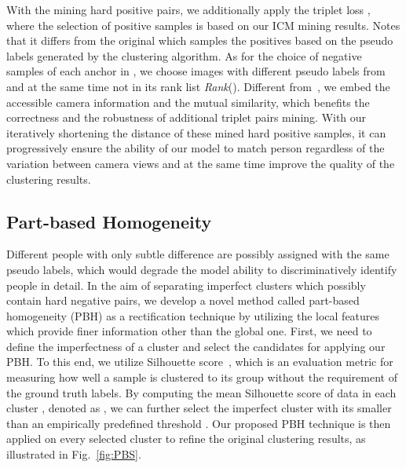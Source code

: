 With the mining hard positive pairs, we additionally apply the triplet loss , where the selection of positive samples is based on our ICM mining results. Notes that it differs from the original  which samples the positives based on the pseudo labels generated by the clustering algorithm.
As for the choice of negative samples of each anchor  in , we choose images with different pseudo labels from  and at the same time not in its rank list \textit{Rank}().
Different from~\cite{PAST}, we embed the accessible camera information and the mutual similarity, which benefits the correctness and the robustness of additional triplet pairs mining.
With our  iteratively shortening the distance of these mined hard positive samples, it can progressively ensure the ability of our model to match person regardless of the variation between camera views and at the same time improve the quality of the clustering results.  
\vspace{-5mm}
\subsection{Part-based Homogeneity} 
\vspace{-2mm}
\label{sub:PBH}
Different people with only subtle difference are possibly assigned with the same pseudo labels, which would degrade the model ability to discriminatively identify people in detail.
In the aim of separating imperfect clusters which possibly contain hard negative pairs, we develop a novel method called part-based homogeneity (PBH) as a rectification technique by utilizing the local features which provide finer information other than the global one.
First, we need to define the imperfectness of a cluster and select the candidates for applying our PBH. To this end, we utilize Silhouette score~\cite{silhouette}, which is an evaluation metric for measuring how well a sample is clustered to its group without the requirement of the ground truth labels. 
By computing the mean Silhouette score of data in each cluster , denoted as , we can further select the imperfect cluster with its  smaller than an empirically predefined threshold .
Our proposed PBH technique is then applied on every selected cluster to refine the original clustering results, as illustrated in Fig.~\ref{fig:PBS}.


